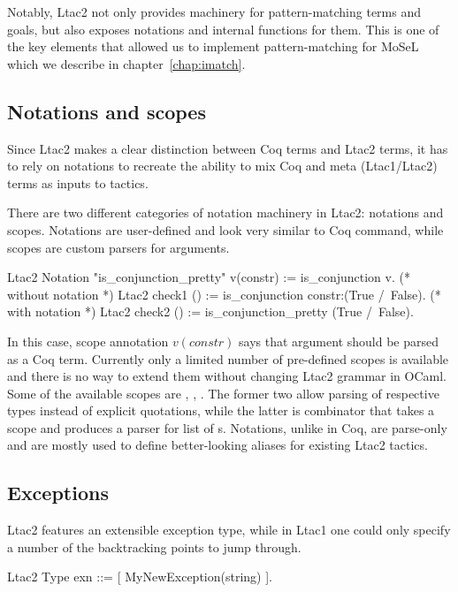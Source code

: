 Notably, Ltac2 not only provides machinery for pattern-matching terms and goals, but also exposes notations and internal functions for them.
This is one of the key elements that allowed us to implement pattern-matching for MoSeL which we describe in chapter~\ref{chap:imatch}.

\subsection{Notations and scopes}
\label{subsec:ltac2-notations-scopes}

Since Ltac2 makes a clear distinction between Coq terms and Ltac2 terms, it has to rely on notations to recreate the ability to mix Coq and meta (Ltac1/Ltac2) terms as inputs to tactics.

There are two different categories of notation machinery in Ltac2: notations and scopes.
Notations are user-defined and look very similar to Coq  command, while scopes are custom parsers for arguments.
\begin{coq}
Ltac2 Notation "is_conjunction_pretty" v(constr) := is_conjunction v.
(* without notation *)
Ltac2 check1 () := is_conjunction constr:(True /\ False).
(* with notation *)
Ltac2 check2 () := is_conjunction_pretty (True /\ False).
\end{coq}

In this case, scope annotation \(v(constr)\) says that argument  should be parsed as a Coq term.
Currently only a limited number of pre-defined scopes is available and there is no way to extend them without changing Ltac2 grammar in OCaml.
Some of the available scopes are , , .
The former two allow parsing of respective types instead of explicit quotations, while the latter is combinator that takes a scope  and produces a parser for list of s.
Notations, unlike in Coq, are parse-only and are mostly used to define better-looking aliases for existing Ltac2 tactics.

\subsection{Exceptions}
\label{subsec:ltac2-exceptions}

Ltac2 features an extensible exception type, while in Ltac1 one could only specify a number of the backtracking points to jump through.
\begin{coq}
Ltac2 Type exn ::= [ MyNewException(string) ].
\end{coq}

